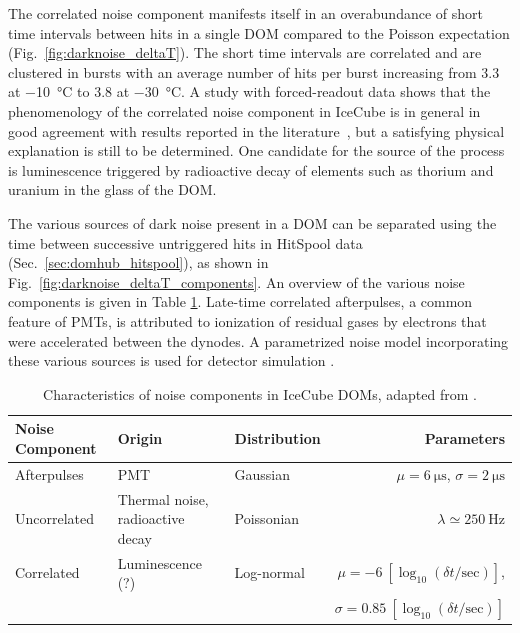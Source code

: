 The correlated noise component manifests itself in an overabundance of
short time intervals between hits in a single DOM compared to the
Poisson expectation (Fig.~\ref{fig:darknoise_deltaT}). The short time
intervals are correlated and are clustered in bursts with an average number of
hits per burst increasing from \num{3.3} at \SI{-10}{\celsius} to \num{3.8} at
\SI{-30}{\celsius}. A study with forced-readout data shows that the
phenomenology of the correlated noise component in IceCube is in general in
good agreement with results reported in the literature~\cite{meyer_noise}, but a satisfying
physical explanation is still to be determined.  One candidate for the source
of the process is luminescence triggered by radioactive decay of
elements such as thorium and uranium in the glass of the DOM.

The various sources of dark noise present in a DOM can be separated using
the time between successive untriggered hits in HitSpool data
(Sec.~\ref{sec:domhub_hitspool}), as shown in 
Fig.~\ref{fig:darknoise_deltaT_components}. An overview of the various 
noise components is given in Table \ref{tab:noise}.  Late-time
correlated afterpulses, a common feature of PMTs, is attributed to
ionization of residual gases by electrons that were accelerated between
the dynodes.  A parametrized noise model incorporating these various sources
is used for detector simulation \cite{larson2013simulation}. 

\begin{table}[h!]
\caption{Characteristics of noise components in IceCube DOMs, adapted from \cite{stanisha_noise_14}.}
  \centering
  \footnotesize
\begin{tabularx}{\textwidth}{lXXr}
\toprule
Noise Component& Origin & Distribution & Parameters \\
\midrule
Afterpulses & PMT & Gaussian & $\mu = \SI{6}{\micro\second}$, $\sigma = \SI{2}{\micro\second}$\\
Uncorrelated & Thermal noise, \newline radioactive decay & Poissonian & $\lambda \simeq \SI{250}{\hertz}$\\
Correlated & Luminescence (?) & Log-normal &
$\mu = \num{-6}\ [\log_{10}(\delta t/\mathrm{sec})]$, \\
& & & 
$\sigma = \num{0.85}\ [\log_{10}(\delta t/\mathrm{sec})]$ \\
\bottomrule
\end{tabularx}
\label{tab:noise}
\end{table}


